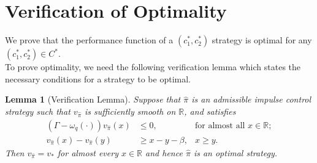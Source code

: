 \documentclass[10pt,a4paper]{amsart}
\newtheorem{lemma}{Lemma}[section]
\newcommand{\reals}{\mathbb{R}}
\newcommand{\homega}{\omega_q}
\renewcommand{\leq}{\leqslant}
\renewcommand{\geq}{\geqslant}
\begin{document}
\section{Verification of Optimality}\label{Sec:Verification}
We prove that the performance function of a $(c_1^\ast,c_2^\ast)$ strategy is optimal for any $(c_1^\ast,c_2^\ast) \in C^\ast$.\\
To prove optimality, we need the following verification lemma which states the necessary conditions for a strategy to be optimal.
\begin{lemma}[Verification Lemma]
	Suppose that $\hat{\pi}$ is an admissible impulse control strategy such that $v_{\hat{\pi}}$ is sufficiently smooth on $\reals$, and satisfies
	\begin{align}
		(\Gamma - \homega(\cdot))v_{\hat{\pi}}(x) &\leq 0, &\text{for almost all } x \in \reals;\label{variational:1}\\
		v_{\hat{\pi}}(x) - v_{\hat{\pi}}(y ) & \geq x-y-\beta, & x\geq y.\label{variational:2}
	\end{align}
	Then $v_{\hat{\pi}} = v_{\ast}$ for almost every $x\in \reals$ and hence $\hat{\pi}$ is an optimal strategy.
\end{lemma}
\end{document}
